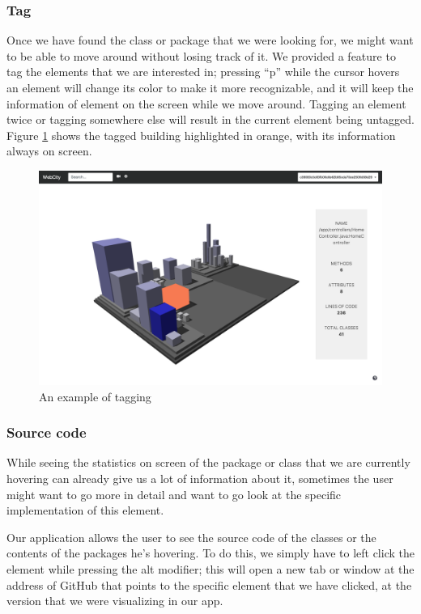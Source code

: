 \documentclass[]{usiinfbachelorproject}
\begin{document}
\subsubsection{Tag} \label{Tag}
Once we have found the class or package that we were looking for, we might want to be able to move around without losing track of it. We provided a feature to tag the elements
that we are interested in; pressing ``p'' while the cursor hovers an element will change its color to make it more recognizable, and it will keep the information of element on the screen
while we move around. Tagging an element twice or tagging somewhere else will result in the current element being untagged.
Figure \ref{fig:tag} shows the tagged building highlighted in orange, with its information always on screen.

\begin{figure} [H]
\centering
\includegraphics[width=1\textwidth]{pictures/tag.png}
\caption{An example of tagging}
\label{fig:tag}
\end{figure}

\subsubsection{Source code} \label{Source code}
While seeing the statistics on screen of the package or class that we are currently hovering can already give us a lot of information about it, sometimes the user might want to go more in detail and want to go look at the specific implementation of this element.

Our application allows the user to see the source code of the classes or the contents of the packages he's hovering. To do this, we simply have to left click the element while pressing the alt modifier; this will open a new tab or window at the address of GitHub that points to the specific element that we have clicked, at the version that we were visualizing in our app.
\end{document}
